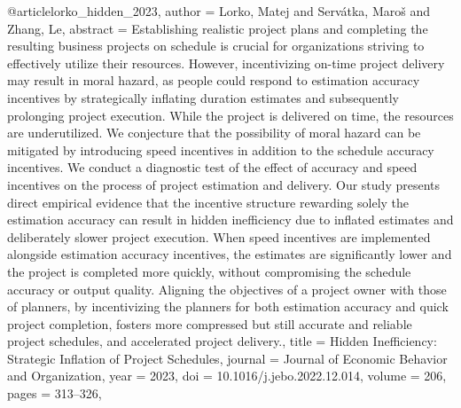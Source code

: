 @article{lorko_hidden_2023,
  author = {Lorko, Matej and Servátka, Maroš and Zhang, Le},
  abstract = {Establishing realistic project plans and completing the resulting business projects on schedule is crucial for organizations striving to effectively utilize their resources. However, incentivizing on-time project delivery may result in moral hazard, as people could respond to estimation accuracy incentives by strategically inflating duration estimates and subsequently prolonging project execution. While the project is delivered on time, the resources are underutilized. We conjecture that the possibility of moral hazard can be mitigated by introducing speed incentives in addition to the schedule accuracy incentives. We conduct a diagnostic test of the effect of accuracy and speed incentives on the process of project estimation and delivery. Our study presents direct empirical evidence that the incentive structure rewarding solely the estimation accuracy can result in hidden inefficiency due to inflated estimates and deliberately slower project execution. When speed incentives are implemented alongside estimation accuracy incentives, the estimates are significantly lower and the project is completed more quickly, without compromising the schedule accuracy or output quality. Aligning the objectives of a project owner with those of planners, by incentivizing the planners for both estimation accuracy and quick project completion, fosters more compressed but still accurate and reliable project schedules, and accelerated project delivery.},
  title = {{Hidden} {Inefficiency}: {Strategic} {Inflation} {of} {Project} {Schedules}},
  journal = {Journal of Economic Behavior and Organization},
  year = {2023},
  doi = {10.1016/j.jebo.2022.12.014},
  volume = {206},
  pages = {313--326},
}

